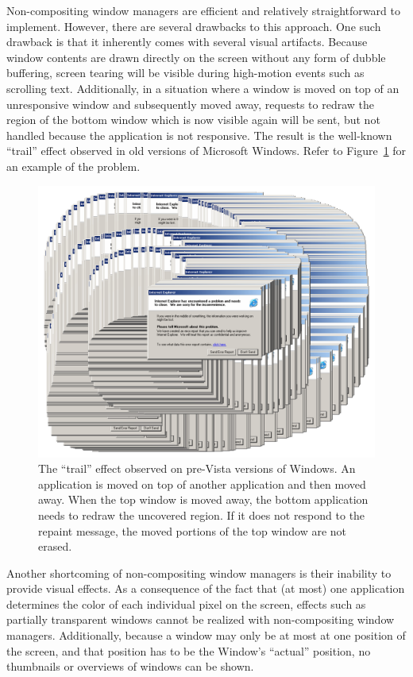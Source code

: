 \documentclass[10pt,twocolumn,a4paper]{article}
\begin{document}
			Non-compositing window managers are efficient and relatively
			straightforward to implement. However, there are several drawbacks
			to this approach.  One such drawback is that it inherently comes
			with several visual artifacts. Because window contents are drawn
			directly on the screen without any form of dubble buffering, screen
			tearing will be visible during high-motion events such as scrolling
			text. Additionally, in a situation where a window is moved on top
			of an unresponsive window and subsequently moved away, requests to
			redraw the region of the bottom window which is now visible again
			will be sent, but not handled because the application is not
			responsive. The result is the well-known \enquote{trail} effect
			observed in old versions of Microsoft Windows. Refer to
			Figure~\ref{fig:trail} for an example of the problem.
			\begin{figure}[h]
				\centering
				\includegraphics[width=0.8\columnwidth]{trail}
				\caption{The \enquote{trail} effect observed on pre-Vista versions
					of Windows. An application is moved on top of another application
					and then moved away. When the top window is moved away, the bottom
					application needs to redraw the uncovered region. If it does not
					respond to the repaint message, the moved portions of the top
					window are not erased.}
				\label{fig:trail}
			\end{figure}

			Another shortcoming of non-compositing window managers is their
			inability to provide visual effects. As a consequence of the fact
			that (at most) one application determines the color of each individual
			pixel on the screen, effects such as partially transparent windows
			cannot be realized with non-compositing window managers. Additionally,
			because a window may only be at most at one position of the screen,
			and that position has to be the Window's \enquote{actual} position,
			no thumbnails or overviews of windows can be shown.
\end{document}
